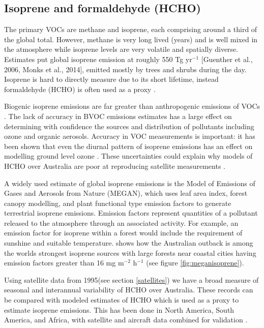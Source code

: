 \subsection{Isoprene and formaldehyde (HCHO)}

The primary VOCs are methane and isoprene, each comprising around a third of the global total.
However, methane is very long lived (years) and is well mixed in the atmosphere while isoprene levels are very volatile and spatially diverse. Estimates put global isoprene emission at roughly 550 Tg yr$^{−1}$ [Guenther et al., 2006, Monks et al., 2014], emitted mostly by trees and shrubs during the day.
Isoprene is hard to directly measure due to its short lifetime, instead formaldehyde (HCHO) is often used as a proxy \cite{Marais_2012,bauwens2013satellite}.

Biogenic isoprene emissions are far greater than anthropogenic emissions of VOCs \cite{Guenther_2006}. 
The lack of accuracy in BVOC emissions estimates has a large effect on determining with confidence the sources and distribution of pollutants including ozone and organic aerosols.
Accuracy in VOC measurements is important: it has been shown that even the diurnal pattern of isoprene emissions has an effect on modelling ground level ozone \cite{Hewitt_2011,Fan_2004}.
These uncertainties could explain why models of HCHO over Australia are poor at reproducing satellite measurements \cite{Stavrakou_2008}.

A widely used estimate of global isoprene emissions is the Model of Emissions of Gases and Aerosols from Nature (MEGAN), which uses leaf area index, forest canopy modelling, and plant functional type emission factors to generate terrestrial isoprene emissions.
Emission factors represent quantities of a pollutant released to the atmosphere through an associated activity.
For example, an emission factor for isoprene within a forest would include the requirement of sunshine and suitable temperature.
\citet{Guenther_2006} shows how the Australian outback is among the worlds strongest isoprene sources with large forests near coastal cities having emission factors greater than 16 mg m$^{-2}$ h$^{-1}$ (see figure \ref{fig:meganisoprene}).

Using satellite data from 1995(see section \ref{satellites}) we have a broad measure of seasonal and interannual variability of HCHO over Australia.
These records can be compared with modeled estimates of HCHO which is used as a proxy to estimate isoprene emissions.
This has been done in North America, South America, and Africa, with satellite and aircraft data combined for validation \cite{Millet_2006, Marais_2014}.

